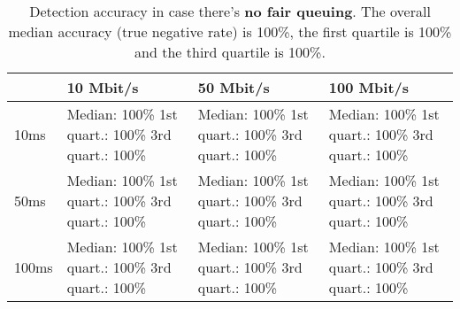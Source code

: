 \documentclass[conference]{IEEEtran}
\begin{document}
\begin{table}
\begin{tabularx}{\columnwidth}{| l | X | X | X |}
\hline
& 10 Mbit/s & 50 Mbit/s & 100 Mbit/s \\ \hline
10ms & Median: 100\% \newline 1st quart.: 100\% \newline 3rd quart.: 100\% & Median: 100\% \newline 1st quart.: 100\% \newline 3rd quart.: 100\% & Median: 100\% \newline 1st quart.: 100\% \newline 3rd quart.: 100\%\\ \hline
50ms & Median: 100\% \newline 1st quart.: 100\% \newline 3rd quart.: 100\% & Median: 100\% \newline 1st quart.: 100\% \newline 3rd quart.: 100\% & Median: 100\% \newline 1st quart.: 100\% \newline 3rd quart.: 100\% \\ \hline
100ms & Median: 100\% \newline 1st quart.: 100\% \newline 3rd quart.: 100\% & Median: 100\% \newline 1st quart.: 100\% \newline 3rd quart.: 100\% & Median: 100\% \newline 1st quart.: 100\% \newline 3rd quart.: 100\% \\ \hline
\end{tabularx}
\caption{Detection accuracy in case there's \textbf{no fair queuing}.  The overall median accuracy (true negative rate) is 100\%, the first quartile is 100\% and the third quartile is 100\%.}
\label{table:no_fq}
\end{table}
\end{document}
